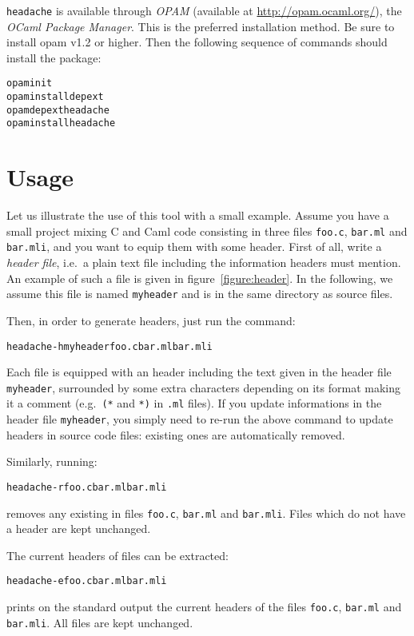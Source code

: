 \documentclass{article}
\newcommand{\mytt}[1]{\texttt{#1}}
\newcommand{\headache}{\mytt{headache}}
\begin{document}
\headache{} is available through \emph{OPAM} (available at
\url{http://opam.ocaml.org/}), the \emph{OCaml Package Manager}.
This is the preferred installation method.
Be sure to install opam v1.2 or higher.
Then the following sequence of commands should install the package:
\begin{alltt}
  opam init
  opam install depext
  opam depext headache
  opam install headache
\end{alltt}

\section{Usage}

Let us illustrate the use of this tool with a small example.  Assume
you have a small project mixing C and Caml code consisting in three
files \mytt{foo.c}, \mytt{bar.ml} and \mytt{bar.mli}, and you want to
equip them with some header.  First of all, write a \emph{header
  file}, i.e.\ a plain text file including the information headers
must mention.  An example of such a file is given in
figure~\ref{figure:header}.  In the following, we assume this file is
named \mytt{myheader} and is in the same directory as source files.

Then, in order to generate headers, just run the command:
\begin{alltt}
  headache -h myheader foo.c bar.ml bar.mli
\end{alltt}
Each file is equipped with an header including the text given in the
header file \mytt{myheader}, surrounded by some extra characters
depending on its format making it a comment (e.g.\ \mytt{(*} and
\mytt{*)} in \mytt{.ml} files).  If you update informations in the
header file \mytt{myheader}, you simply need to re-run the above
command to update headers in source code files: existing ones are
automatically removed.

Similarly, running:
\begin{alltt}
  headache -r foo.c bar.ml bar.mli
\end{alltt}
removes any existing in files \mytt{foo.c}, \mytt{bar.ml} and
\mytt{bar.mli}.  Files which do not have a header are kept unchanged.

The current headers of files can be extracted:
\begin{alltt}
  headache -e foo.c bar.ml bar.mli
\end{alltt}
prints on the standard output the current headers of the files \mytt{foo.c},
\mytt{bar.ml} and \mytt{bar.mli}. All files are kept unchanged.
\end{document}

